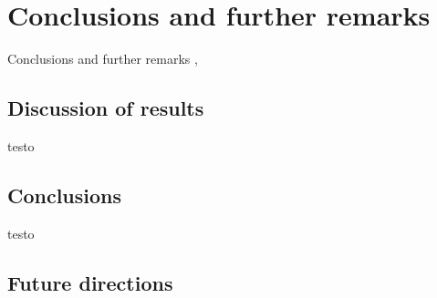 \setchapterpreamble[u]{\margintoc}
\chapter{Conclusions and further remarks}

Conclusions and further remarks
, 

\section{Discussion of results} 

testo


\section{Conclusions} 

testo


\section{Future directions} 





